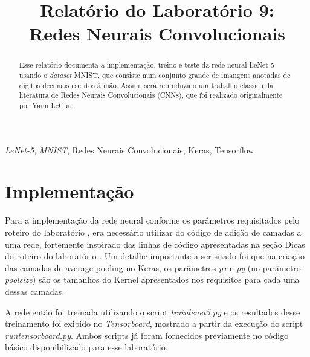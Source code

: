\documentclass[conference]{IEEEtran}
\begin{document}
\title{Relatório do Laboratório 9: \\ Redes Neurais Convolucionais\\
}

\author{
}

\maketitle

\begin{abstract}
Esse relatório documenta a implementação, treino e teste da rede neural LeNet-5 usando o \textit{dataset} MNIST, que consiste num conjunto grande de imangens anotadas de dígitos decimais escritos à mão. Assim, será reproduzido um trabalho clássico da literatura de Redes Neurais Convolucionais (CNNs), que foi realizado originalmente por Yann LeCun.
\end{abstract}

\begin{IEEEkeywords}
\textit{LeNet-5}, \textit{MNIST}, Redes Neurais Convolucionais, Keras, Tensorflow
\end{IEEEkeywords}

\section{Implementação}
Para a implementação da rede neural conforme os parâmetros requisitados pelo roteiro do laboratório \cite{roteiro}, era necessário utilizar do código de adição de camadas a uma rede, fortemente inspirado das linhas de código apresentadas na seção Dicas do roteiro do laboratório \cite{roteiro}. Um detalhe importante a ser sitado foi que na criação das camadas de average pooling no Keras, os parâmetros \textit{px} e \textit{py} (no parâmetro \textit{pool\underline{\space}size}) são os tamanhos do Kernel apresentados nos requisitos para cada uma dessas camadas.

A rede então foi treinada utilizando o script \textit{train\underline{\space}lenet5.py} e os resultados desse treinamento foi exibido no \textit{Tensorboard}, mostrado a partir da execução do script \textit{run\underline{\space}tensorboard.py}. Ambos scripts já foram fornecidos previamente no código básico disponibilizado para esse laboratório.
\end{document}
